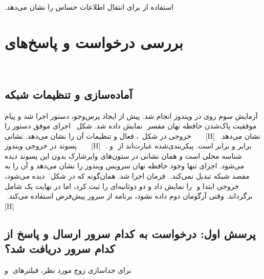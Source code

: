 ‫استفاده از  برای انتقال اطلاعات حساس را نشان می‌دهد.
‫
‫\section{بررسی درخواست و پاسخ‌های }
‫
‫\subsection{آماده‌سازی و تنظیمات شبکه}
‫
‫آزمایش سوم روی  در ویندوز انجام شد. پیش از ایجاد پرس‌وجو،
‫دستور  اجرا شد و پیام موفقیت پاک‌شدن حافظه نهان
‫مفسر
‫ نمایش داده شد. شکل~ اجرای موفق دستور را
‫نشان می‌دهد.
‫
‫[H]
‫
‫
‫
‫
‫
‫خروجی  در شکل~،  فعال و تنظیمات آن را
‫نشان می‌دهد. نشانی  برابر  و 
‫برابر  است. 
‫پیکربندی‌شده عبارت‌اند از
‫ و .
‫
‫[H]
‫
‫
‫
‫
‫
‫پسوند  در خروجی ویندوز شناسه  محلی است و همان نشانی در ستون‌های وایرشارک بدون
‫این پسوند دیده می‌شود. اجرای  تنها وجود
‫حافظه نهان سرویس  ویندوز را نشان می‌دهد و آن را به مقصد شبکه تبدیل نمی‌کند.
‫
‫فرمان  اجرا شد. همان‌گونه که در
‫شکل~ دیده می‌شود، خروجی ابتدا  و
‫ را نمایش داد و دو  دوثانیه‌ای را ثبت کرد، اما در
‫نهایت یک  شامل  برگرداند.
‫وقتی آرگومان دوم  داده نشود، برنامه از سرور پیش‌فرض
‫استفاده می‌کند.
‫
‫[H]
‫
‫
‫
‫
‫
‫\subsection{پرسش اول: درخواست به کدام سرور ارسال و پاسخ از کدام سرور دریافت شد؟}
‫
‫برای جداسازی زوج مورد نظر، فیلترهای
‫ و
